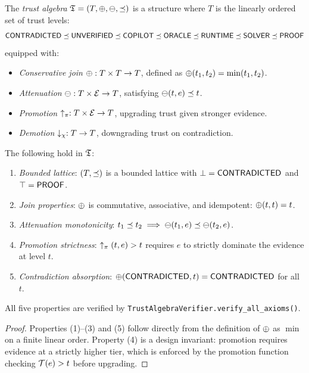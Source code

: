 \begin{definition}\label{def:trust}
The \emph{trust algebra} $\mathfrak{T} = (T, \oplus, \ominus, \preceq)$ is a
structure where $T$ is the linearly ordered set of trust levels:
\[
  \mathsf{CONTRADICTED} \preceq \mathsf{UNVERIFIED} \preceq \mathsf{COPILOT} \preceq \mathsf{ORACLE} \preceq
  \mathsf{RUNTIME} \preceq \mathsf{SOLVER} \preceq \mathsf{PROOF}
\]
equipped with:
\begin{itemize}
  \item \emph{Conservative join} $\oplus: T \times T \to T$, defined as
        $\oplus(t_1, t_2) = \min(t_1, t_2)$.
  \item \emph{Attenuation} $\ominus: T \times \mathcal{E} \to T$, satisfying
        $\ominus(t, e) \preceq t$.
  \item \emph{Promotion} $\uparrow_\pi: T \times \mathcal{E} \to T$, upgrading
        trust given stronger evidence.
  \item \emph{Demotion} $\downarrow_\chi: T \to T$, downgrading trust on
        contradiction.
\end{itemize}
\end{definition}

\begin{theorem}\label{thm:trust}
The following hold in $\mathfrak{T}$:
\begin{enumerate}
  \item \emph{Bounded lattice}: $(T, \preceq)$ is a bounded lattice with
        $\bot = \mathsf{CONTRADICTED}$ and $\top = \mathsf{PROOF}$.
  \item \emph{Join properties}: $\oplus$ is commutative, associative,
        and idempotent: $\oplus(t, t) = t$.
  \item \emph{Attenuation monotonicity}: $t_1 \preceq t_2 \implies
        \ominus(t_1, e) \preceq \ominus(t_2, e)$.
  \item \emph{Promotion strictness}: $\uparrow_\pi(t, e) > t$ requires
        $e$ to strictly dominate the evidence at level $t$.
  \item \emph{Contradiction absorption}: $\oplus(\mathsf{CONTRADICTED}, t) = \mathsf{CONTRADICTED}$
        for all $t$.
\end{enumerate}
All five properties are verified by \texttt{TrustAlgebraVerifier.verify\_all\_axioms()}.
\end{theorem}

\begin{proof}
Properties (1)--(3) and (5) follow directly from the definition of $\oplus$
as $\min$ on a finite linear order.  Property (4) is a design invariant:
promotion requires evidence at a strictly higher tier, which is enforced
by the promotion function checking $\mathcal{T}(e) > t$ before upgrading.
\end{proof}

